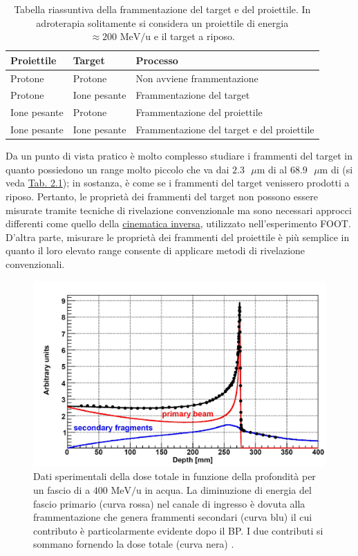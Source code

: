\documentclass[12pt,a4paper,twoside]{report}
\begin{document}
	\begin{table}[H]
		\begin{minipage}{\textwidth}
			\centering
			\begin{tabular}{ |M{2.87cm}|M{2.87cm}||m{7.7cm}| }
				\hline
				Proiettile & Target & Processo\\
				\hline\hline
				Protone & Protone & Non avviene frammentazione\\
				\hline
				Protone & Ione pesante & Frammentazione del target\\
				\hline
				Ione pesante & Protone & Frammentazione del proiettile\\
				\hline
				Ione pesante & Ione pesante & Frammentazione del target e del proiettile\\
				\hline
			\end{tabular}
		\end{minipage}
		\caption{Tabella riassuntiva della frammentazione del target e del proiettile. In adroterapia solitamente si considera un proiettile di energia $\approx200\mbox{ MeV/u}$ e il target a riposo.}
		\label{tab:fragmentation}
	\end{table}
	Da un punto di vista pratico è molto complesso studiare i frammenti del target in quanto possiedono un range molto piccolo che va dai $2.3\mbox{ }\mu\mbox{m}$ di  al $68.9\mbox{ }\mu\mbox{m}$ di  (si veda \hyperref[tab:range]{Tab. 2.1}); in sostanza, è come se i frammenti del target venissero prodotti a riposo. Pertanto, le proprietà dei frammenti del target non possono essere misurate tramite tecniche di rivelazione convenzionale ma sono necessari approcci differenti come quello della \hyperref[sec:cinematica_inversa]{cinematica inversa}, utilizzato nell'esperimento FOOT. D'altra parte, misurare le proprietà dei frammenti del proiettile è più semplice in quanto il loro elevato range consente di applicare metodi di rivelazione convenzionali.
	\begin{figure}[H]
		\centering
		\includegraphics[width=0.78\linewidth]{late_release.jpg}
		\caption{Dati sperimentali della dose totale in funzione della profondità per un fascio di  a $400\mbox{ MeV/u}$ in acqua. La diminuzione di energia del fascio primario (curva rossa) nel canale di ingresso è dovuta alla frammentazione che genera frammenti secondari (curva blu) il cui contributo è particolarmente evidente dopo il BP. I due contributi si sommano fornendo la dose totale (curva nera) \cite{mairani}.}
		\label{fig:late_release}
	\end{figure}
\end{document}
